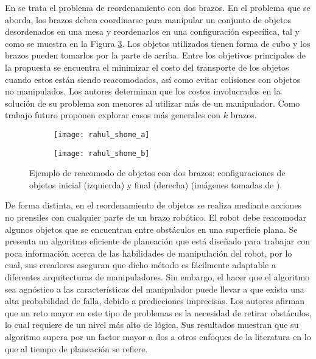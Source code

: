 En \cite{10.1007/978-3-030-44051-0_45} se trata el problema de reordenamiento con dos brazos.
En el problema que se aborda, los brazos deben coordinarse para manipular un conjunto de objetos desordenados en una mesa y reordenarlos en una configuración específica, tal y como se muestra en la Figura \ref{fig:10.1007/978-3-030-44051-0_45}.
Los objetos utilizados tienen forma de cubo y los brazos pueden tomarlos por la parte de arriba.
Entre los objetivos principales de la propuesta se encuentra el minimizar el costo del transporte de los objetos cuando estos están siendo reacomodados, así como evitar colisiones con objetos no manipulados.
Los autores determinan que los costos involucrados en la solución de su problema son menores al utilizar más de un manipulador.
Como trabajo futuro proponen explorar casos más generales con $k$ brazos.
%
\begin{figure}[H]
	\begin{subfigure}{0.35\linewidth}
		\texttt{[image: rahul\_shome\_a]}%
		\label{subfig:initial_conf}%
	\end{subfigure}%
	\hspace{1cm}%
	\begin{subfigure}{0.35\linewidth}
		\texttt{[image: rahul\_shome\_b]}%
		\label{subfig:final_conf}%
	\end{subfigure}%
	\caption{Ejemplo de reacomodo de objetos con dos brazos: configuraciones de objetos inicial (izquierda) y final (derecha) (imágenes tomadas de \cite{10.1007/978-3-030-44051-0_45}).}%
	\label{fig:10.1007/978-3-030-44051-0_45}%
\end{figure}
%
De forma distinta, en \cite{2019arXiv190103557H} el reordenamiento de objetos se realiza mediante acciones no prensiles con cualquier parte de un brazo robótico.
El robot debe reacomodar algunos objetos que se encuentran entre obstáculos en una superficie plana.
Se presenta un algoritmo eficiente de planeación que está diseñado para trabajar con poca información acerca de las habilidades de manipulación del robot, por lo cual, sus creadores aseguran que dicho método es fácilmente adaptable a diferentes arquitecturas de manipuladores.
Sin embargo, el hacer que el algoritmo sea agnóstico a las características del manipulador puede llevar a que exista una alta probabilidad de falla, debido a predicciones imprecisas.
Los autores afirman que un reto mayor en este tipo de problemas es la necesidad de retirar obstáculos, lo cual requiere de un nivel más alto de lógica.
Sus resultados muestran que su algoritmo supera por un factor mayor a dos a otros enfoques de la literatura en lo que al tiempo de planeación se refiere.

